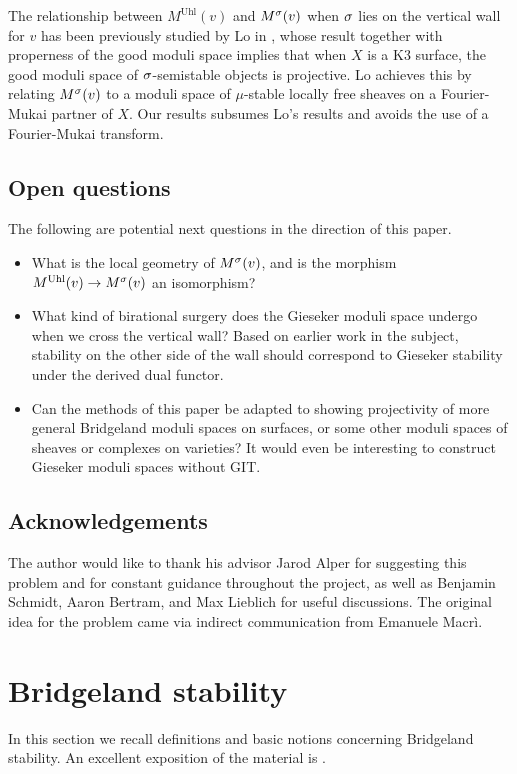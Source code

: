 \documentclass[letterpaper,12pt]{amsart}
\theoremstyle{remark}
\begin{document}
The relationship between $M^{\mathrm{Uhl}}(v)$ and $M^\sigma(v)$ when $\sigma$ lies on the vertical wall for $v$ has been previously studied by Lo in \cite{lo}, whose result together with properness of the good moduli space implies that when $X$ is a K3 surface, the good moduli space of $\sigma$-semistable objects is projective. Lo achieves this by relating $M^\sigma(v)$ to a moduli space of $\mu$-stable locally free sheaves on a Fourier-Mukai partner of $X$. Our results subsumes Lo's results and avoids the use of a Fourier-Mukai transform.

\subsection*{Open questions}
The following are potential next questions in the direction of this paper.
\begin{itemize}
    \item What is the local geometry of $M^\sigma(v)$, and is the morphism $M^{\mathrm{Uhl}}(v) \to M^\sigma(v)$ an isomorphism?
    \item What kind of birational surgery does the Gieseker moduli space undergo when we cross the vertical wall? Based on earlier work in the subject, stability on the other side of the wall should correspond to Gieseker stability under the derived dual functor.
    \item Can the methods of this paper be adapted to showing projectivity of more general Bridgeland moduli spaces on surfaces, or some other moduli spaces of sheaves or complexes on varieties? It would even be interesting to construct Gieseker moduli spaces without GIT. 
\end{itemize}

\subsection*{Acknowledgements}

The author would like to thank his advisor Jarod Alper for suggesting this problem and for constant guidance throughout the project, as well as Benjamin Schmidt, Aaron Bertram, and Max Lieblich for useful discussions. The original idea for the problem came via indirect communication from Emanuele Macr\`i. 




\section{Bridgeland stability}
In this section we recall definitions and basic notions concerning Bridgeland stability. An excellent exposition of the material is \cite{MS}. 
\end{document}
